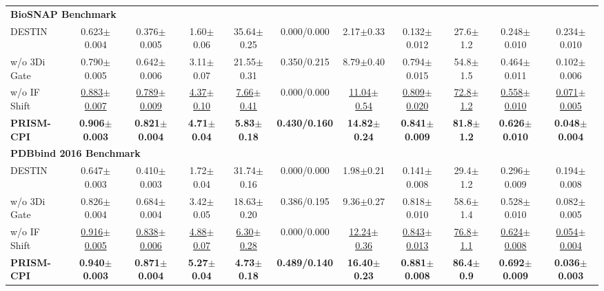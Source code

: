 \begin{table}[H]
{{\begin{tabular}{l cccccccccc}
\midrule
\multicolumn{11}{l}{\textbf{BioSNAP Benchmark}} \\
\hspace{3pt}DESTIN & 0.623${\pm}$0.004 & 0.376${\pm}$0.005 & 1.60${\pm}$0.06 & 35.64${\pm}$0.25 & 0.000/0.000 & 2.17${\pm}$0.33 & 0.132${\pm}$0.012 & 27.6${\pm}$1.2 & 0.248${\pm}$0.010 & 0.234${\pm}$0.010 \\
\hspace{3pt}w/o 3Di Gate & 0.790${\pm}$0.005 & 0.642${\pm}$0.006 & 3.11${\pm}$0.07 & 21.55${\pm}$0.31 & 0.350/0.215 & 8.79${\pm}$0.40 & 0.794${\pm}$0.015 & 54.8${\pm}$1.5 & 0.464${\pm}$0.011 & 0.102${\pm}$0.006 \\
\hspace{3pt}w/o IF Shift & \underline{0.883${\pm}$0.007} & \underline{0.789${\pm}$0.009} & \underline{4.37${\pm}$0.10} & \underline{7.66${\pm}$0.41} & 0.000/0.000 & \underline{11.04${\pm}$0.54} & \underline{0.809${\pm}$0.020} & \underline{72.8${\pm}$1.2} & \underline{0.558${\pm}$0.010} & \underline{0.071${\pm}$0.005} \\
\hspace{3pt}\textbf{PRISM-CPI} & \textbf{0.906${\pm}$0.003} & \textbf{0.821${\pm}$0.004} & \textbf{4.71${\pm}$0.04} & \textbf{5.83${\pm}$0.18} & \textbf{0.430/0.160} & \textbf{14.82${\pm}$0.24} & \textbf{0.841${\pm}$0.009} & \textbf{81.8${\pm}$1.2} & \textbf{0.626${\pm}$0.010} & \textbf{0.048${\pm}$0.004} \\
\midrule
\multicolumn{11}{l}{\textbf{PDBbind 2016 Benchmark}} \\
\hspace{3pt}DESTIN & 0.647${\pm}$0.003 & 0.410${\pm}$0.003 & 1.72${\pm}$0.04 & 31.74${\pm}$0.16 & 0.000/0.000 & 1.98${\pm}$0.21 & 0.141${\pm}$0.008 & 29.4${\pm}$1.2 & 0.296${\pm}$0.009 & 0.194${\pm}$0.008 \\
\hspace{3pt}w/o 3Di Gate & 0.826${\pm}$0.004 & 0.684${\pm}$0.004 & 3.42${\pm}$0.05 & 18.63${\pm}$0.20 & 0.386/0.195 & 9.36${\pm}$0.27 & 0.818${\pm}$0.010 & 58.6${\pm}$1.4 & 0.528${\pm}$0.010 & 0.082${\pm}$0.005 \\
\hspace{3pt}w/o IF Shift & \underline{0.916${\pm}$0.005} & \underline{0.838${\pm}$0.006} & \underline{4.88${\pm}$0.07} & \underline{6.30${\pm}$0.28} & 0.000/0.000 & \underline{12.24${\pm}$0.36} & \underline{0.843${\pm}$0.013} & \underline{76.8${\pm}$1.1} & \underline{0.624${\pm}$0.008} & \underline{0.054${\pm}$0.004} \\
\hspace{3pt}\textbf{PRISM-CPI} & \textbf{0.940${\pm}$0.003} & \textbf{0.871${\pm}$0.004} & \textbf{5.27${\pm}$0.04} & \textbf{4.73${\pm}$0.18} & \textbf{0.489/0.140} & \textbf{16.40${\pm}$0.23} & \textbf{0.881${\pm}$0.008} & \textbf{86.4${\pm}$0.9} & \textbf{0.692${\pm}$0.009} & \textbf{0.036${\pm}$0.003} \\

\end{tabular}}}
\end{table}
